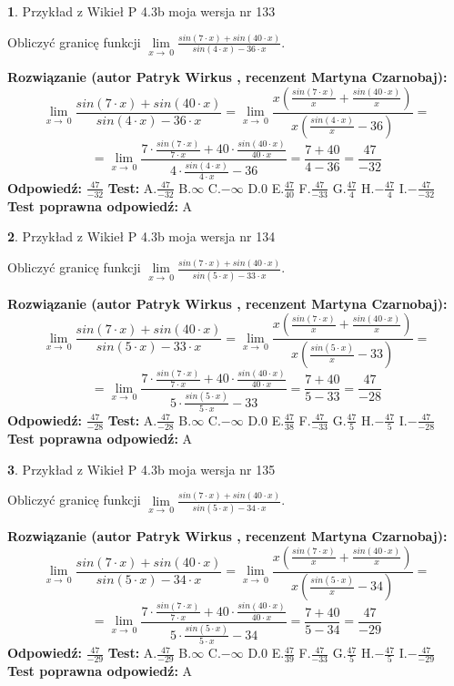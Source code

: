 \documentclass[12pt, a4paper]{article}
\theoremstyle{definition} %
\newtheorem{zad}{}
\newcommand{\zadStart}[1]{\begin{zad}#1\newline}
\newcommand{\zadStop}{\end{zad}}
\newcommand{\rozwStart}[2]{\noindent \textbf{Rozwiązanie (autor #1 , recenzent #2): }\newline}
\newcommand{\rozwStop}{\newline}
\newcommand{\odpStart}{\noindent \textbf{Odpowiedź:}\newline}
\newcommand{\odpStop}{\newline}
\newcommand{\testStart}{\noindent \textbf{Test:}\newline}
\newcommand{\testStop}{\newline}
\newcommand{\kluczStart}{\noindent \textbf{Test poprawna odpowiedź:}\newline}
\newcommand{\kluczStop}{\newline}
\begin{document}
\zadStart{Przykład z Wikieł P 4.3b moja wersja nr 133}


Obliczyć granicę funkcji $\lim\limits_{x\to\ 0}\frac{sin(7 \cdot x)+sin(40 \cdot x)}{sin(4 \cdot x)-36 \cdot x}$.
\zadStop
\rozwStart{Patryk Wirkus}{Martyna Czarnobaj}
$$\lim\limits_{x\to\ 0}\frac{sin(7 \cdot x)+sin(40 \cdot x)}{sin(4 \cdot x)-36 \cdot x}=\lim\limits_{x\to\ 0}\frac{x(\frac{sin(7 \cdot x)}{x}+\frac{sin(40 \cdot x)}{x})}{x(\frac{sin(4 \cdot x)}{x}-36)}=$$
$$=\lim\limits_{x\to\ 0}\frac{7 \cdot \frac{sin(7 \cdot x)}{7 \cdot x}+40 \cdot \frac{sin(40 \cdot x)}{40 \cdot x}}{4 \cdot \frac{sin(4 \cdot x)}{4 \cdot x}-36}=\frac{7+40}{4-36} = \frac{47}{-32}$$
\rozwStop
\odpStart
$\frac{47}{-32}$
\odpStop
\testStart
A.$\frac{47}{-32}$
B.$\infty$
C.$-\infty$
D.$0$
E.$\frac{47}{40}$
F.$\frac{47}{-33}$
G.$\frac{47}{4}$
H.$-\frac{47}{4}$
I.$-\frac{47}{-32}$
\testStop
\kluczStart
A
\kluczStop



\zadStart{Przykład z Wikieł P 4.3b moja wersja nr 134}


Obliczyć granicę funkcji $\lim\limits_{x\to\ 0}\frac{sin(7 \cdot x)+sin(40 \cdot x)}{sin(5 \cdot x)-33 \cdot x}$.
\zadStop
\rozwStart{Patryk Wirkus}{Martyna Czarnobaj}
$$\lim\limits_{x\to\ 0}\frac{sin(7 \cdot x)+sin(40 \cdot x)}{sin(5 \cdot x)-33 \cdot x}=\lim\limits_{x\to\ 0}\frac{x(\frac{sin(7 \cdot x)}{x}+\frac{sin(40 \cdot x)}{x})}{x(\frac{sin(5 \cdot x)}{x}-33)}=$$
$$=\lim\limits_{x\to\ 0}\frac{7 \cdot \frac{sin(7 \cdot x)}{7 \cdot x}+40 \cdot \frac{sin(40 \cdot x)}{40 \cdot x}}{5 \cdot \frac{sin(5 \cdot x)}{5 \cdot x}-33}=\frac{7+40}{5-33} = \frac{47}{-28}$$
\rozwStop
\odpStart
$\frac{47}{-28}$
\odpStop
\testStart
A.$\frac{47}{-28}$
B.$\infty$
C.$-\infty$
D.$0$
E.$\frac{47}{38}$
F.$\frac{47}{-33}$
G.$\frac{47}{5}$
H.$-\frac{47}{5}$
I.$-\frac{47}{-28}$
\testStop
\kluczStart
A
\kluczStop



\zadStart{Przykład z Wikieł P 4.3b moja wersja nr 135}


Obliczyć granicę funkcji $\lim\limits_{x\to\ 0}\frac{sin(7 \cdot x)+sin(40 \cdot x)}{sin(5 \cdot x)-34 \cdot x}$.
\zadStop
\rozwStart{Patryk Wirkus}{Martyna Czarnobaj}
$$\lim\limits_{x\to\ 0}\frac{sin(7 \cdot x)+sin(40 \cdot x)}{sin(5 \cdot x)-34 \cdot x}=\lim\limits_{x\to\ 0}\frac{x(\frac{sin(7 \cdot x)}{x}+\frac{sin(40 \cdot x)}{x})}{x(\frac{sin(5 \cdot x)}{x}-34)}=$$
$$=\lim\limits_{x\to\ 0}\frac{7 \cdot \frac{sin(7 \cdot x)}{7 \cdot x}+40 \cdot \frac{sin(40 \cdot x)}{40 \cdot x}}{5 \cdot \frac{sin(5 \cdot x)}{5 \cdot x}-34}=\frac{7+40}{5-34} = \frac{47}{-29}$$
\rozwStop
\odpStart
$\frac{47}{-29}$
\odpStop
\testStart
A.$\frac{47}{-29}$
B.$\infty$
C.$-\infty$
D.$0$
E.$\frac{47}{39}$
F.$\frac{47}{-33}$
G.$\frac{47}{5}$
H.$-\frac{47}{5}$
I.$-\frac{47}{-29}$
\testStop
\kluczStart
A
\kluczStop
\end{document}
